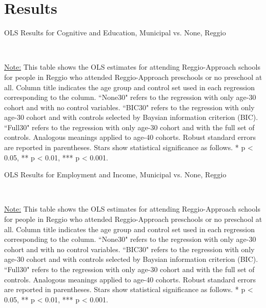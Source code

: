 





\section{Results}
\label{sec:results}

\begin{table}[H] \caption{OLS Results for Cognitive and Education, Municipal vs. None, Reggio} \label{ols-E-reg}

\vspace{1ex} \\
\footnotesize\raggedright{\underline{Note:} This table shows the OLS estimates for attending Reggio-Approach schools for people in Reggio who attended Reggio-Approach preschools or no preschool at all. Column title indicates the age group and control set used in each regression corresponding to the column. ``None30" refers to the regression with only age-30 cohort and with no control variables. ``BIC30" refers to the regression with only age-30 cohort and with controls selected by Baysian information criterion (BIC). ``Full30" refers to the regression with only age-30 cohort and with the full set of controls. Analogous meanings applied to age-40 cohorts. Robust standard errors are reported in parentheses. Stars show statistical significance as follows. * p < 0.05, ** p < 0.01, *** p < 0.001.}
\end{table}

\begin{table}[H] \caption{OLS Results for Employment and Income, Municipal vs. None, Reggio} \label{ols-W-reg}
\scalebox{0.95}{
}
\vspace{1ex} \\
\footnotesize\raggedright{\underline{Note:} This table shows the OLS estimates for attending Reggio-Approach schools for people in Reggio who attended Reggio-Approach preschools or no preschool at all. Column title indicates the age group and control set used in each regression corresponding to the column. ``None30" refers to the regression with only age-30 cohort and with no control variables. ``BIC30" refers to the regression with only age-30 cohort and with controls selected by Baysian information criterion (BIC). ``Full30" refers to the regression with only age-30 cohort and with the full set of controls. Analogous meanings applied to age-40 cohorts. Robust standard errors are reported in parentheses. Stars show statistical significance as follows. * p < 0.05, ** p < 0.01, *** p < 0.001.}
\end{table}

